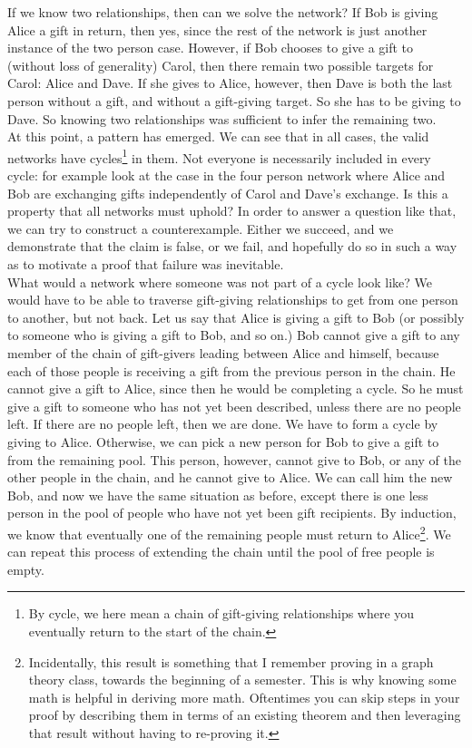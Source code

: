 \documentclass{article}
\begin{document}
If we know two relationships, then can we solve the network? If Bob is giving Alice a gift in return, then yes, since the rest of the network is just another instance of the two person case. However, if Bob chooses to give a gift to (without loss of generality) Carol, then there remain two possible targets for Carol: Alice and Dave. If she gives to Alice, however, then Dave is both the last person without a gift, and without a gift-giving target. So she has to be giving to Dave. So knowing two relationships was sufficient to infer the remaining two.\\

At this point, a pattern has emerged. We can see that in all cases, the valid networks have cycles\footnote{By cycle, we here mean a chain of gift-giving relationships where you eventually return to the start of the chain.} in them. Not everyone is necessarily included in every cycle: for example look at the case in the four person network where Alice and Bob are exchanging gifts independently of Carol and Dave's exchange. Is this a property that all networks must uphold? In order to answer a question like that, we can try to construct a counterexample. Either we succeed, and we demonstrate that the claim is false, or we fail, and hopefully do so in such a way as to motivate a proof that failure was inevitable.\\

What would a network where someone was not part of a cycle look like? We would have to be able to traverse gift-giving relationships to get from one person to another, but not back. Let us say that Alice is giving a gift to Bob (or possibly to someone who is giving a gift to Bob, and so on.) Bob cannot give a gift to any member of the chain of gift-givers leading between Alice and himself, because each of those people is receiving a gift from the previous person in the chain. He cannot give a gift to Alice, since then he would be completing a cycle. So he must give a gift to someone who has not yet been described, unless there are no people left. If there are no people left, then we are done. We have to form a cycle by giving to Alice. Otherwise, we can pick a new person for Bob to give a gift to from the remaining pool. This person, however, cannot give to Bob, or any of the other people in the chain, and he cannot give to Alice. We can call him the new Bob, and now we have the same situation as before, except there is one less person in the pool of people who have not yet been gift recipients. By induction, we know that eventually one of the remaining people must return to Alice\footnote{Incidentally, this result is something that I remember proving in a graph theory class, towards the beginning of a semester. This is why knowing some math is helpful in deriving more math. Oftentimes you can skip steps in your proof by describing them in terms of an existing theorem and then leveraging that result without having to re-proving it.}. We can repeat this process of extending the chain until the pool of free people is empty.\\
\end{document}
